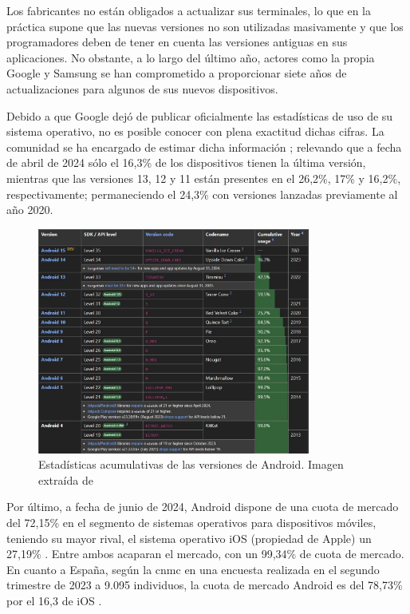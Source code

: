         Los fabricantes no están obligados a actualizar sus terminales, lo que en la práctica supone que las nuevas versiones no son utilizadas masivamente y que los programadores deben de tener en cuenta las versiones antiguas en sus aplicaciones. No obstante, a lo largo del último año, actores como la propia Google \cite{ricca_google_2023} y Samsung \cite{ramirez_samsung_2024} se han comprometido a proporcionar siete años de actualizaciones para algunos de sus nuevos dispositivos.
        
        Debido a que Google dejó de publicar oficialmente las estadísticas de uso de su sistema operativo, no es posible conocer con plena exactitud dichas cifras. La comunidad se ha encargado de estimar dicha información \cite{belinski_android_nodate}; relevando que a fecha de abril de 2024 sólo el 16,3\% de los dispositivos tienen la última versión, mientras que las versiones 13, 12 y 11 están presentes en el 26,2\%, 17\% y 16,2\%, respectivamente; permaneciendo el 24,3\% con versiones lanzadas previamente al año 2020.

        \begin{figure}[h]
            \centering
            \includegraphics[width=0.8\textwidth]{figures/Android usage.JPG}
            \caption[Estadísticas acumulativas de las versiones de Android]
            {Estadísticas acumulativas de las versiones de Android. Imagen extraída de \cite{belinski_android_nodate}}
            \label{figure:android:usage}
        \end{figure}

        Por último, a fecha de junio de 2024, Android dispone de una cuota de mercado del 72,15\% en el segmento de sistemas operativos para dispositivos móviles, teniendo su mayor rival, el sistema operativo iOS (propiedad de Apple) un 27,19\% \cite{melo_infografi_2024}. Entre ambos acaparan el mercado, con un 99,34\% de cuota de mercado. En cuanto a España, según la \gls{cnmc} en una encuesta realizada en el segundo trimestre de 2023 a 9.095 individuos, la cuota de mercado Android es del 78,73\% por el 16,3 de iOS \cite{comision_nacional_de_los_mercados_y_la_competencia_android_2023}.

